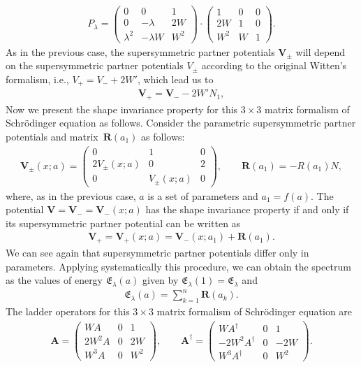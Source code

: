 \documentclass[pdftex]{sigma}%
\numberwithin{equation}{section}
\begin{document}
\begin{gather*}
P_\lambda =
\begin{pmatrix} 0 & 0 & 1 \\ 0 & - \lambda & 2 W \\ \lambda^2 & -\lambda W & W^2 \end{pmatrix} \cdot \begin{pmatrix} 1 & 0 & 0 \\ 2W & 1 & 0 \\ W^2 & W & 1 \end{pmatrix}\!.
\end{gather*}
As in the previous case, the supersymmetric partner potentials $\mathbf{V}_\pm$ will depend on the supersymmetric partner potentials $V_\pm$ according to the original Witten's formalism, i.e., $V_+=V_-+2W'$, which lead us to
\begin{gather*}
\mathbf{V}_+=\mathbf{V}_- -2W'N_1,
\end{gather*}
Now we present the shape invariance property for this $3\times 3$ matrix formalism of Schr\"odinger equation as follows. Consider the parametric supersymmetric partner potentials and matrix~$\mathbf{R}(a_1)$ as follows:
\begin{gather*}
\mathbf{V}_\pm(x;a)=\begin{pmatrix}0&1&0\\2V_{\pm}(x;a)&0&2\\0&V_{\pm}(x;a)&0\end{pmatrix}\!,\qquad \mathbf{R}(a_1)=-R(a_1)N,
\end{gather*}
where, as in the previous case, $a$ is a set of parameters and $a_1=f(a)$. The potential $\mathbf{V}=\mathbf{V}_-=\mathbf{V}_-(x;a)$ has the shape invariance property if and only if its supersymmetric partner potential can be written as
\begin{gather*}
\mathbf{V}_+=\mathbf{V}_+(x;a)=\mathbf{V}_-(x;a_1)+\mathbf{R}(a_1).
\end{gather*}
We can see again that supersymmetric partner potentials differ only in parameters. Applying systematically this procedure, we can obtain the spectrum as the values of energy $\mathfrak E_\lambda (a)$
given by $ \mathfrak E_\lambda (1) = \mathfrak E_\lambda $ and
\begin{gather*}
\mathfrak E_\lambda (a)=\sum_{k=1}^n \mathbf{R}(a_k).
\end{gather*}
The ladder operators for this $3\times 3$ matrix formalism of Schr\"odinger equation are
\begin{gather*}
\mathbf{A}=\begin{pmatrix}WA&0&1\\2W^2A&0&2W\\W^3A&0&W^2\end{pmatrix}\!, \qquad
\mathbf{A}^\dag=\begin{pmatrix}
WA^\dag&0&1\\-2W^2A^\dag&0&-2W\\W^3A^\dag&0&W^2
\end{pmatrix}\!.
\end{gather*}
\end{document}
